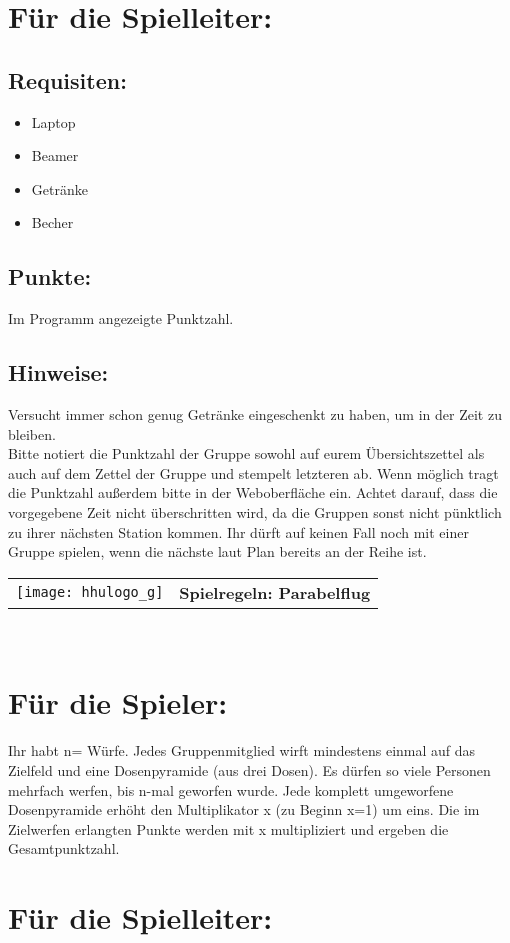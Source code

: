 \documentclass[a4paper,10pt]{article}
\def\spielh{Parabelflug}
\newcommand{\unten}{
 Bitte notiert die Punktzahl der Gruppe sowohl auf eurem Übersichtszettel als auch auf dem Zettel der Gruppe und stempelt letzteren ab. Wenn möglich tragt die Punktzahl außerdem bitte in der Weboberfläche ein.
 Achtet darauf, dass die vorgegebene Zeit nicht überschritten wird, da die Gruppen sonst nicht pünktlich zu ihrer nächsten Station kommen. Ihr dürft auf keinen Fall noch mit einer Gruppe spielen, wenn die nächste laut Plan bereits an der Reihe ist.
}
\begin{document}
\section*{Für die Spielleiter:}
\subsection*{Requisiten:} 
\begin{itemize}
 \item Laptop
 \item Beamer
 \item Getränke
 \item Becher
\end{itemize}
\subsection*{Punkte:}
Im Programm angezeigte Punktzahl.

\subsection*{Hinweise:}
Versucht immer schon genug Getränke eingeschenkt zu haben, um in der Zeit zu bleiben.\\
\unten

\newpage


  \begin{tabularx}{\textwidth}{lc}
    \texttt{[image: hhulogo\_g]}
  & {\Huge \textbf{Spielregeln: \spielh}}
  \end{tabularx}\\


\Large
\section*{Für die Spieler:}
Ihr habt n=\underline{\hspace{1cm}} Würfe. Jedes Gruppenmitglied wirft mindestens einmal auf das Zielfeld und eine Dosenpyramide (aus drei Dosen). Es dürfen so viele Personen mehrfach werfen, bis n-mal geworfen wurde. Jede komplett umgeworfene Dosenpyramide erhöht den Multiplikator x (zu Beginn x=1) um eins. Die im Zielwerfen erlangten Punkte werden mit x multipliziert und ergeben die Gesamtpunktzahl.


\section*{Für die Spielleiter:}
\end{document}
